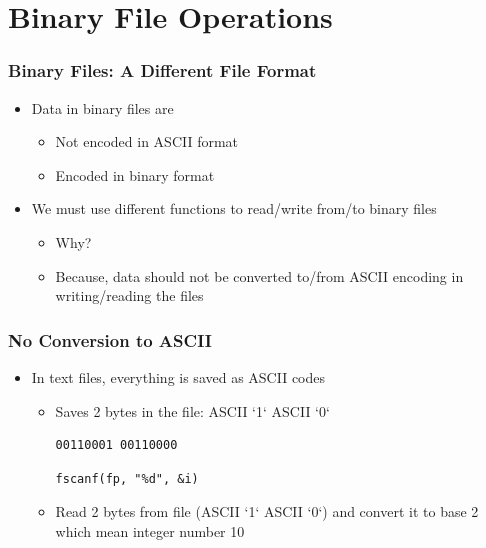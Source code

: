 \documentclass{../c-lecture}
\begin{document}
\section{Binary File Operations}

\begin{frame}
  \frametitle{Binary Files: A Different File Format}
  \begin{itemize}
    \item Data in binary files are
    \begin{itemize}
      \item Not encoded in ASCII format
      \item Encoded in binary format
    \end{itemize}
    \item We must use different functions to read/write from/to binary files
    \begin{itemize}
      \item Why?
      \item
        Because, data should not be converted to/from ASCII encoding in
        writing/reading the files
    \end{itemize}
  \end{itemize}
\end{frame}

\begin{frame}[fragile]
  \frametitle{No Conversion to ASCII}
  \begin{itemize}
    \item In text files, everything is saved as ASCII codes
    \begin{itemize}
      \begin{verbatim}
fprintf(fp, "%d", 10)
      \end{verbatim}
      \item Saves 2 bytes in the file: ASCII `1` ASCII `0`
      \begin{verbatim}
00110001 00110000
      \end{verbatim}
      \begin{verbatim}
fscanf(fp, "%d", &i)
      \end{verbatim}
      \item
        Read 2 bytes from file (ASCII `1` ASCII `0`) and convert it to base 2
        which mean integer number 10
    \end{itemize}
  \end{itemize}
\end{frame}
\end{document}
